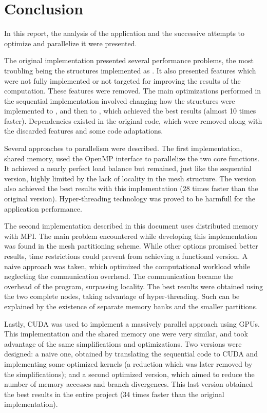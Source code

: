 \section{Conclusion}
\label{sec:conclusion}

In this report, the analysis of the \polu application and the successive attempts to optimize and parallelize it were presented.

The original implementation presented several performance problems, the most troubling being the structures implemented as \aop. It also presented features which were not fully implemented or not targeted for improving the results of the computation. These features were removed. The main optimizations performed in the sequential implementation involved changing how the structures were implemented to \aos, and then to \soa, which achieved the best results (almost 10 times faster).
Dependencies existed in the original code, which were removed along with the discarded features and some code adaptations.

Several approaches to parallelism were described. The first implementation, shared memory, used the OpenMP interface to parallelize the two core functions. It achieved a nearly perfect load balance but remained, just like the sequential version, highly limited by the lack of locality in the mesh structure. The \soa version also achieved the best results with this implementation (28 times faster than the original version). \intel Hyper-threading technology was proved to be harmfull for the application performance.

The second implementation described in this document uses distributed memory with MPI. The main problem encountered while developing this implementation was found in the mesh partitioning scheme. While other options promised better results, time restrictions could prevent from achieving a functional version. A naive approach was taken, which optimized the computational workload while neglecting the communication overhead. The communication became the overhead of the program, surpassing locality. The best results were obtained using the two complete nodes, taking advantage of hyper-threading. Such can be explained by the existence of separate memory banks and the smaller partitions.

Lastly, CUDA was used to implement a massively parallel approach using GPUs. This implementation and the shared memory one were very similar, and took advantage of the same simplifications and optimizations. Two versions were designed: a naive one, obtained by translating the sequential code to CUDA and implementing some optimized kernels (a reduction which was later removed by the simplifications); and a second optimized version, which aimed to reduce the number of memory accesses and branch divergences. This last version obtained the best results in the entire project (34 times faster than the original implementation).

